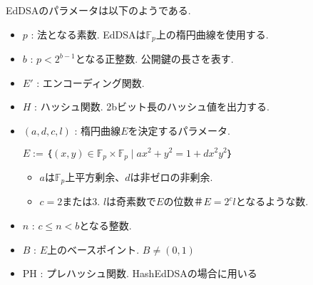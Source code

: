 EdDSAのパラメータは以下のようである.
\begin{itemize}
  \item $p$ : 法となる素数. EdDSAは$\mathbb{F}_p$上の楕円曲線を使用する.
  \item $b$ : $p<2^{b-1}$となる正整数. 公開鍵の長さを表す. 
  \item $E'$ : エンコーディング関数.
  \item $H$ : ハッシュ関数. 2bビット長のハッシュ値を出力する.
  \item $(a,d,c,l)$ : 楕円曲線$E$を決定するパラメータ. \\
        \begin{center}
          $E := ｛(x,y) \in \mathbb{F}_p \times \mathbb{F}_p \mid ax^2 + y^2 = 1 + dx^2y^2｝$
        \end{center}
        \begin{itemize}
          \item $a$は$\mathbb{F}_p$上平方剰余、$d$は非ゼロの非剰余.
          \item $c=2$または$3$. $l$は奇素数で$E$の位数$＃E=2^{c}l$となるような数.
        \end{itemize}
  \item $n$ : $c\leq n < b$となる整数.
  \item $B$ : $E$上のベースポイント. $B\neq (0,1)$
  \item PH : プレハッシュ関数. HashEdDSAの場合に用いる
\end{itemize}
